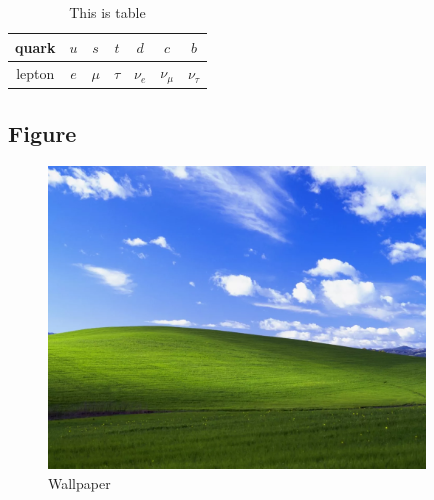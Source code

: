 \documentclass[letterpaper,12pt]{article}
\begin{document}
\begin{table}[h]
    \centering
    \begin{tabular}{c|cccccc}
    quark & $u$ & $s$ & $t$ & $d$ & $c$ & $b$\\
    \hline
    lepton & $e$ & $\mu$ & $\tau$ & $\nu_e$ & $\nu_\mu$ & $\nu_\tau$
    \end{tabular}
    \caption{This is table}
    \label{table1.1}
\end{table}

\newpage
\subsection{Figure}

\begin{figure}[h]
    \centering
    \includegraphics[width=10cm]{wallpaper.png}
    \caption{Wallpaper}
    \label{figure1.1}
\end{figure}
\end{document}
